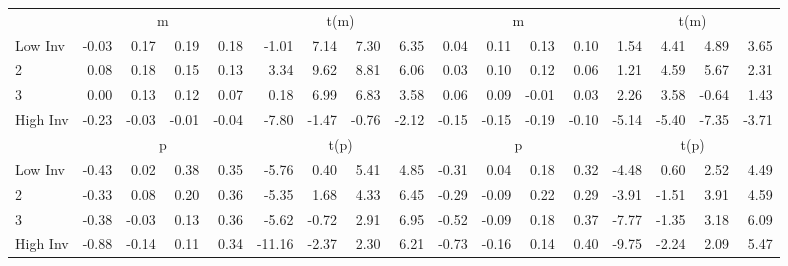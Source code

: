 \begin{table}[!ht]
\begin{tabular}{lrrrrrrrrrrrrrrrr}
  
    
      & \multicolumn{4}{c}{m} & \multicolumn{4}{c}{t(m)}
    
      & \multicolumn{4}{c}{m} & \multicolumn{4}{c}{t(m)}
    
    \\
      \cmidrule(r){2-5} \cmidrule(r){6-9} \cmidrule(r){10-13} \cmidrule(r){14-17}

    Low Inv   & -0.03  & 0.17  & 0.19  & 0.18  & -1.01  & 7.14  & 7.30  & 6.35  & 0.04  & 0.11  & 0.13  & 0.10  & 1.54  & 4.41  & 4.89  & 3.65  \\
           2  & 0.08  & 0.18  & 0.15  & 0.13  & 3.34  & 9.62  & 8.81  & 6.06  & 0.03  & 0.10  & 0.12  & 0.06  & 1.21  & 4.59  & 5.67  & 2.31  \\
           3  & 0.00  & 0.13  & 0.12  & 0.07  & 0.18  & 6.99  & 6.83  & 3.58  & 0.06  & 0.09  & -0.01  & 0.03  & 2.26  & 3.58  & -0.64  & 1.43  \\
    High Inv  & -0.23  & -0.03  & -0.01  & -0.04  & -7.80  & -1.47  & -0.76  & -2.12  & -0.15  & -0.15  & -0.19  & -0.10  & -5.14  & -5.40  & -7.35  & -3.71  \\

  
    
      & \multicolumn{4}{c}{p} & \multicolumn{4}{c}{t(p)}
    
      & \multicolumn{4}{c}{p} & \multicolumn{4}{c}{t(p)}
    
    \\
      \cmidrule(r){2-5} \cmidrule(r){6-9} \cmidrule(r){10-13} \cmidrule(r){14-17}

    Low Inv   & -0.43  & 0.02  & 0.38  & 0.35  & -5.76  & 0.40  & 5.41  & 4.85  & -0.31  & 0.04  & 0.18  & 0.32  & -4.48  & 0.60  & 2.52  & 4.49  \\
           2  & -0.33  & 0.08  & 0.20  & 0.36  & -5.35  & 1.68  & 4.33  & 6.45  & -0.29  & -0.09  & 0.22  & 0.29  & -3.91  & -1.51  & 3.91  & 4.59  \\
           3  & -0.38  & -0.03  & 0.13  & 0.36  & -5.62  & -0.72  & 2.91  & 6.95  & -0.52  & -0.09  & 0.18  & 0.37  & -7.77  & -1.35  & 3.18  & 6.09  \\
    High Inv  & -0.88  & -0.14  & 0.11  & 0.34  & -11.16  & -2.37  & 2.30  & 6.21  & -0.73  & -0.16  & 0.14  & 0.40  & -9.75  & -2.24  & 2.09  & 5.47  \\

  

  \bottomrule
\end{tabular}
\label{tbl:32_Size_OP_Inv_B16}
\end{table}